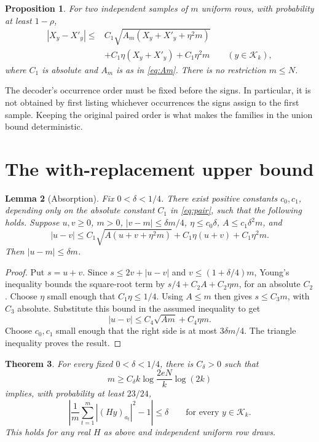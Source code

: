 \documentclass[11pt]{article}
\newtheorem{theorem}{Theorem}[section]
\newtheorem{proposition}[theorem]{Proposition}
\newtheorem{lemma}[theorem]{Lemma}
\theoremstyle{remark}
\newcommand{\1}{\mathbf 1}
\newcommand{\K}{\mathcal K}
\begin{document}
\begin{proposition}\label{prop:pair}
For two independent samples of $m$ uniform rows, with probability at
least $1-\rho$,
\begin{equation}\label{eq:pair}
 \begin{split}
 |X_y-X'_y|\leq{}& C_1\sqrt{A_m(X_y+X'_y+\eta^2m)}\\
 &+C_1\eta(X_y+X'_y)+C_1\eta^2m
 \qquad (y\in\K_k),
 \end{split}
\end{equation}
where $C_1$ is absolute and $A_m$ is as in \eqref{eq:Am}.
There is no restriction $m\leq N$.
\end{proposition}

The decoder's occurrence order must be fixed before the signs. In
particular, it is not obtained by first listing whichever occurrences
the signs assign to the first sample. Keeping the original paired order
is what makes the families in the union bound deterministic.

\section{The with-replacement upper bound}

\begin{lemma}[Absorption]\label{lem:absorb}
Fix $0<\delta<1/4$. There exist positive constants $c_0,c_1$, depending
only on the absolute constant $C_1$ in \eqref{eq:pair}, such that the
following holds. Suppose $u,v\geq0$, $m>0$,
$|v-m|\leq\delta m/4$, $\eta\leq c_0\delta$, $A\leq c_1\delta^2m$,
and
\[
 |u-v|\leq C_1\sqrt{A(u+v+\eta^2m)}
                +C_1\eta(u+v)+C_1\eta^2m.
\]
Then $|u-m|\leq\delta m$.
\end{lemma}

\begin{proof}
Put $s=u+v$. Since $s\leq2v+|u-v|$ and $v\leq(1+\delta/4)m$, Young's
inequality bounds the square-root term by $s/4+C_2A+C_2\eta m$, for an
absolute $C_2$. Choose $\eta$ small enough that $C_1\eta\leq1/4$.
Using $A\leq m$ then gives $s\leq C_3m$, with $C_3$ absolute.
Substitute this bound in the assumed inequality to get
\[
 |u-v|\leq C_4\sqrt{Am}+C_4\eta m.
\]
Choose $c_0,c_1$ small enough that the right side is at most
$3\delta m/4$. The triangle inequality proves the result.
\end{proof}

\begin{theorem}\label{thm:upper}
For every fixed $0<\delta<1/4$, there is $C_\delta>0$ such that
\begin{equation}\label{eq:upperm}
 m\geq C_\delta k\log\frac{2eN}{k}\log(2k)
\end{equation}
implies, with probability at least $23/24$,
\[
 \left|\frac1m\sum_{t=1}^m |(Hy)_{a_t}|^2-1\right|\leq\delta
 \qquad\text{for every }y\in\K_k.
\]
This holds for any real $H$ as above and independent uniform row draws.
\end{theorem}
\end{document}
